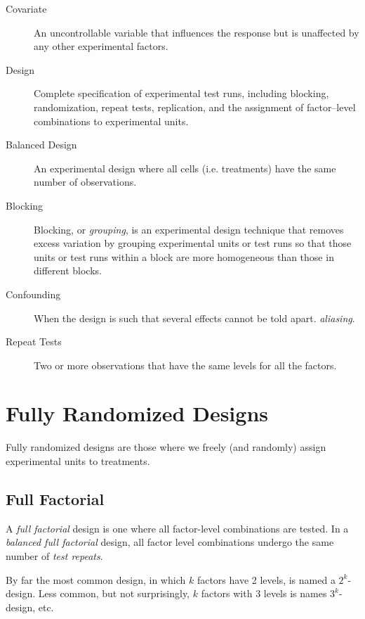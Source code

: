\begin{description}
\item [Covariate]  An uncontrollable variable that influences the response but is
unaffected by any other experimental factors.

\item [Design]  Complete specification of experimental test runs, including blocking, randomization, repeat tests, replication, and the assignment of factor–level combinations to experimental units.

\item [Balanced Design] An experimental design where all cells (i.e. treatments) have the same number of observations.

\item [Blocking]  Blocking, or \emph{grouping}, is an experimental design technique that removes excess variation by grouping experimental units or test runs so that those units or test runs within a block are more homogeneous than those in different blocks.

\item [Confounding] When the design is such that several effects cannot be told apart. \Aka \emph{aliasing}.

\item [Repeat Tests] Two or more observations that have the same levels for all the factors.

\end{description}







\section{Fully Randomized Designs}
Fully randomized designs are those where we freely (and randomly) assign experimental units to treatments.


\subsection{Full Factorial}
A \emph{full factorial} design is one where all factor-level combinations are tested.
In a \emph{balanced full factorial} design, all factor level combinations undergo the same number of \emph{test repeats}.

By far the most common design, in which $k$ factors have 2 levels, is named a $2^k$-design.
Less common, but not surprisingly, $k$ factors with 3 levels is names $3^k$-design, etc.




